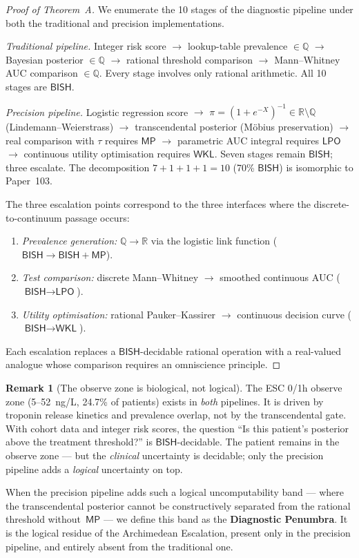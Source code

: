 \documentclass[11pt,a4paper]{article}
\theoremstyle{plain}
\theoremstyle{definition}
\newtheorem{remark}[theorem]{Remark}
\newcommand{\BISH}{\textsf{BISH}}
\newcommand{\WKL}{\textsf{WKL}}
\newcommand{\LPO}{\textsf{LPO}}
\newcommand{\MP}{\textsf{MP}}
\newcommand{\Q}{\mathbb{Q}}
\newcommand{\R}{\mathbb{R}}
\begin{document}
\begin{proof}[Proof of Theorem~A]
We enumerate the 10 stages of the diagnostic pipeline under both the traditional and precision implementations.

\emph{Traditional pipeline.}  Integer risk score $\to$ lookup-table prevalence $\in \Q$ $\to$ Bayesian posterior $\in \Q$ $\to$ rational threshold comparison $\to$ Mann--Whitney AUC comparison $\in \Q$.  Every stage involves only rational arithmetic.  All 10 stages are $\BISH$.

\emph{Precision pipeline.}  Logistic regression score $\to$ $\pi = (1+e^{-X})^{-1} \in \R \setminus \Q$ (Lindemann--Weierstrass) $\to$ transcendental posterior (M\"obius preservation) $\to$ real comparison with $\tau$ requires $\MP$ $\to$ parametric AUC integral requires $\LPO$ $\to$ continuous utility optimisation requires $\WKL$.  Seven stages remain $\BISH$; three escalate.  The decomposition $7 + 1 + 1 + 1 = 10$ (70\% $\BISH$) is isomorphic to Paper~103.

The three escalation points correspond to the three interfaces where the discrete-to-continuum passage occurs:
\begin{enumerate}[nosep]
\item \emph{Prevalence generation:} $\Q \to \R$ via the logistic link function ($\BISH \to \BISH + \MP$).
\item \emph{Test comparison:} discrete Mann--Whitney $\to$ smoothed continuous AUC ($\BISH \to \LPO$).
\item \emph{Utility optimisation:} rational Pauker--Kassirer $\to$ continuous decision curve ($\BISH \to \WKL$).
\end{enumerate}
Each escalation replaces a $\BISH$-decidable rational operation with a real-valued analogue whose comparison requires an omniscience principle.
\end{proof}

\begin{remark}[The observe zone is biological, not logical]\label{rmk:biological}
The ESC 0/1h observe zone (5--52~ng/L, 24.7\% of patients) exists in \emph{both} pipelines.  It is driven by troponin release kinetics and prevalence overlap, not by the transcendental gate.  With cohort data and integer risk scores, the question ``Is this patient's posterior above the treatment threshold?'' is $\BISH$-decidable.  The patient remains in the observe zone --- but the \emph{clinical} uncertainty is decidable; only the precision pipeline adds a \emph{logical} uncertainty on top.

When the precision pipeline adds such a logical uncomputability band --- where the transcendental posterior cannot be constructively separated from the rational threshold without~$\MP$ --- we define this band as the \textbf{Diagnostic Penumbra}.  It is the logical residue of the Archimedean Escalation, present only in the precision pipeline, and entirely absent from the traditional one.
\end{remark}
\end{document}
